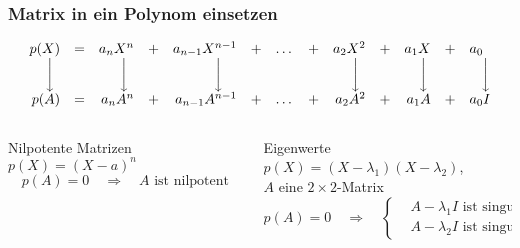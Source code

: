 %
%
%
\begin{frame}[t]
\frametitle{Matrix in ein Polynom einsetzen}
\vspace{-10pt}
\[
\begin{array}{rcrcrcrcrcrcr}
p(X)&=&a_nX^n&+&a_{n-1}X^{n-1}&+&\dots&+&a_2X^2&+&a_1X&+&a_0\phantom{I}\\
\bigg\downarrow\hspace*{4pt}      & &
\bigg\downarrow\hspace*{4pt}      & &
\bigg\downarrow\hspace*{10pt}                   & &     & &
\bigg\downarrow\hspace*{4pt}           & &
\bigg\downarrow\hspace*{2pt}         & &
\bigg\downarrow\hspace*{0pt}                   \\
p(A)&=&a_nA^n&+&a_{n-1}A^{n-1}&+&\dots&+&a_2A^2&+&a_1A&+&a_0         I
\end{array}
\]
\vspace{-10pt}
\begin{columns}[t,onlytextwidth]
\begin{column}{0.48\textwidth}
\begin{block}{Nilpotente Matrizen}
$p(X) = (X-a)^n$
\[
p(A) = 0
\quad\Rightarrow\quad
\text{$A$ ist nilpotent}
\]
\end{block}
\end{column}
\begin{column}{0.48\textwidth}
\begin{block}{Eigenwerte}
$p(X) = (X-\lambda_1)(X-\lambda_2)$,\\
$A$ eine $2\times 2$-Matrix
\[
p(A)=0\quad\Rightarrow\quad
\left\{
\begin{aligned}
&\text{$A-\lambda_1I$ ist singulär}\\
&\text{$A-\lambda_2I$ ist singulär}
\end{aligned}
\right.
\]
\end{block}
\end{column}
\end{columns}

\end{frame}
